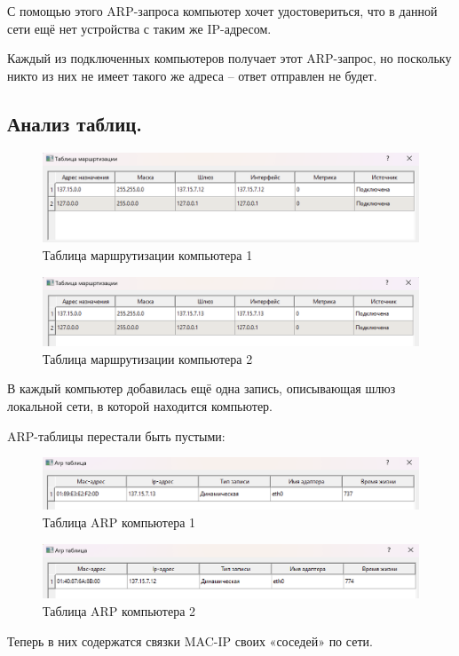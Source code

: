 \documentclass[12pt,onecolumn]{article}
\begin{document}
С помощью этого ARP-запроса компьютер хочет удостовериться, что в данной сети ещё нет устройства с таким же IP-адресом.

Каждый из подключенных компьютеров получает этот ARP-запрос, но поскольку никто из них не имеет такого же адреса – ответ отправлен не будет.

\subsection{Анализ таблиц.}
\begin{figure}[H]
  \centering
  \includegraphics[width=\textwidth]{image/part1/route-table-1.png}
  \caption{Таблица маршрутизации компьютера 1}
\end{figure}
\begin{figure}[H]
  \centering
  \includegraphics[width=\textwidth]{image/part1/route-table-2.png}
  \caption{Таблица маршрутизации компьютера 2}
\end{figure}
В каждый компьютер добавилась ещё одна запись, описывающая шлюз локальной сети, в которой находится компьютер.

ARP-таблицы перестали быть пустыми:
\begin{figure}[H]
  \centering
  \includegraphics[width=\textwidth]{image/part1/arp-table-1.png}
  \caption{Таблица ARP компьютера 1}
\end{figure}
\begin{figure}[H]
  \centering
  \includegraphics[width=\textwidth]{image/part1/arp-table-2.png}
  \caption{Таблица ARP компьютера 2}
\end{figure}
Теперь в них содержатся связки MAC-IP своих «соседей» по сети.
\end{document}
